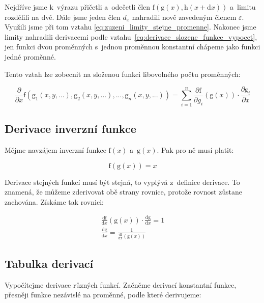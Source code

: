 Nejdříve jsme k~výrazu přičetli a~odečetli člen \(\mathrm{f}(\mathrm{g}(x), \mathrm{h}(x + \mathrm{d}x))\) a~limitu rozdělili na dvě. Dále jsme jeden člen \(d_x\) nahradili nově zavedeným členem \(\varepsilon\). Využili jsme při tom vztahu \eqref{eq:zuzeni_limity_stejne_promenne}.
Nakonec jsme limity nahradili derivacemi podle vztahu~\eqref{eq:derivace_slozene_funkce_vypocet}, jen funkci dvou proměnných s~jednou proměnnou konstantní chápeme jako funkci jedné proměnné.

Tento vztah lze zobecnit na složenou funkci libovolného počtu proměnných:

\begin{equation}
\frac{\partial}{\partial x} \mathrm{f} (\mathrm{g}_1(x, y, ...), \mathrm{g}_2(x, y, ...), ..., \mathrm{g}_n(x, y, ...)) = \sum_{i=1}^n \frac{\partial \mathrm{f}}{\partial g_i}(\mathrm{g}(x)) \cdot \frac{\partial \mathrm{g}_i}{\partial x}
\end{equation}

\subsection{Derivace inverzní funkce}

Mějme navzájem inverzní funkce \(\mathrm{f}(x)\) a~\(\mathrm{g}(x)\). Pak pro ně musí platit:

\begin{equation}
\mathrm{f}(\mathrm{g}(x)) = x
\end{equation}

Derivace stejných funkcí musí být stejná, to vyplývá z~definice derivace. To znamená, že můžeme zderivovat obě strany rovnice, protože rovnost zůstane zachována. Získáme tak rovnici:

\begin{equation}
\begin{split}
\frac{\mathrm{df}}{\mathrm{d}x}(\mathrm{g}(x)) \cdot \frac{\mathrm{dg}}{\mathrm{d}x} = 1 \\
\frac{\mathrm{dg}}{\mathrm{d}x} = \frac{1}{\frac{\mathrm{df}}{\mathrm{d}x}(\mathrm{g}(x))}
\end{split}
\end{equation}

\subsection{Tabulka derivací}

Vypočítejme derivace různých funkcí. Začněme derivací konstantní funkce, přesněji funkce nezávislé na proměnné, podle které derivujeme:

